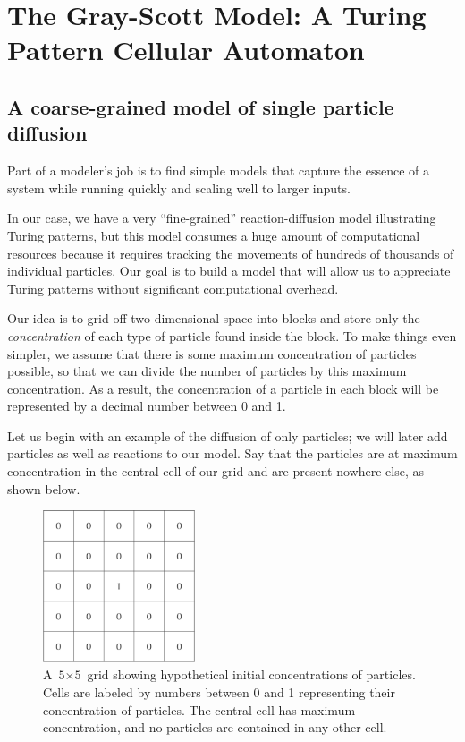 \FloatBarrier
{}

\section{The Gray-Scott Model: A Turing Pattern Cellular Automaton}
\label{sec:the_gray-scott_model:_a_turing_pattern_cellular_automaton}

\subsection{A coarse-grained model of single particle diffusion}


Part of a modeler's job is to find simple models that capture the essence of a system while running quickly and scaling well to larger inputs.

In our case, we have a very ``fine-grained'' reaction-diffusion model illustrating Turing patterns, but this model consumes a huge amount of computational resources because it requires tracking the movements of hundreds of thousands of individual particles. Our goal is to build a model that will allow us to appreciate Turing patterns without significant computational overhead.

Our idea is to grid off two-dimensional space into blocks and store only the \textit{concentration} of each type of particle found inside the block. To make things even simpler, we assume that there is some maximum concentration of particles possible, so that we can divide the number of particles by this maximum concentration. As a result, the concentration of a particle in each block will be represented by a decimal number between 0 and 1.

Let us begin with an example of the diffusion of only  particles; we will later add  particles as well as reactions to our model. Say that the particles are at maximum concentration in the central cell of our grid and are present nowhere else, as shown below.

\begin{figure}[h]
\centering
\mySfFamily
\includegraphics[width = 0.4\textwidth]{../images/initial_A_concentration.png}
\caption{A $\text{5} \times \text{5}$ grid showing hypothetical initial concentrations of  particles. Cells are labeled by numbers between 0 and 1 representing their concentration of  particles. The central cell has maximum concentration, and no particles are contained in any other cell.}
\label{fig:initial_A_concentration}
\end{figure}

